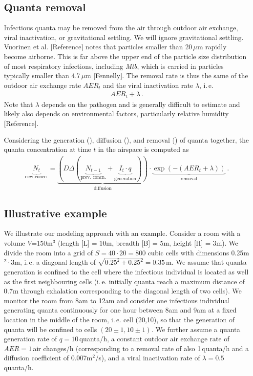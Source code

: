 \documentclass[fleqn,11pt]{wlscirep_supp}
\newcommand\ie{i.\,e.\xspace}
\begin{document}
\subsection{Quanta removal}\label{sec:quanta-removal}

Infectious quanta may be removed from the air through outdoor air exchange, viral inactivation, or gravitational settling. We will ignore gravitational settling. Vuorinen et al. [Reference] notes that particles smaller than 20\,$\mu$m rapidly become airborne. This is far above the upper end of the particle size distribution of most respiratory infections, including \emph{Mtb}, which is carried in particles typically smaller than 4.7\,$\mu$m [Fennelly]. The removal rate is thus the same of the outdoor air exchange rate $AER_t$ and the viral inactivation rate $\lambda$, \ie 
\begin{align}\label{eq:removal}
    AER_t + \lambda ~.
\end{align}
Note that $\lambda$ depends on the pathogen and is generally difficult to estimate and likely also depends on environmental factors, particularly relative humidity [Reference]. 

Considering the generation (), diffusion (), and removal () of quanta together, the quanta concentration at time $t$ in the airspace is computed as
\begin{align}
    \underbrace{N_{t}}_{\text{new concn.}} = \underbrace{\left(D \Delta (\underbrace{N_{t-1}}_{\text{prev. concn.}} + \underbrace{I_t \cdot q}_{\text{generation}})\right)}_{\text{diffusion}} \cdot \underbrace{\exp\left(-(AER_t + \lambda)\right)}_{\text{removal}} ~.
\end{align}

\subsection{Illustrative example}

We illustrate our modeling approach with an example. Consider a room with a volume $V$=150m$^3$ (length [L] = 10m, breadth [B] = 5m, height [H] = 3m). We divide the room into a grid of $S = 40 \cdot 20 = 800$ cubic cells with dimensions 0.25m$^2 \cdot 3$m, \ie a diagonal length of $\sqrt{0.25^2 + 0.25^2} = 0.35$\,m. We assume that quanta generation is confined to the cell where the infectious individual is located as well as the first neighbouring cells (\ie initially quanta reach a maximum distance of 0.7m through exhalation corresponding to the diagonal length of two cells). We monitor the room from 8am to 12am and consider one infectious individual generating quanta continuously for one hour between 8am and 9am at a fixed location in the middle of the room, \ie cell (20,10), so that the generation of quanta will be confined to cells $(20\pm1,10\pm1)$. We further assume a quanta generation rate of $q = 10$\,quanta/h, a constant outdoor air exchange rate of $AER = 1$\,air changes/h (corresponding to a removal rate of also 1\,quanta/h and a diffusion coefficient of 0.007m$^2$/s), and a viral inactivation rate of $\lambda = 0.5$\,quanta/h. 
\end{document}
